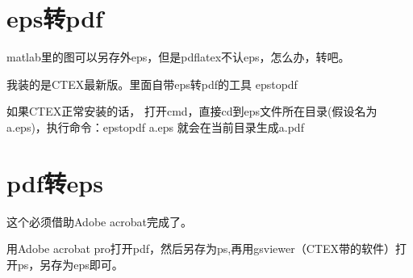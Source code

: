 \documentclass[10pt,a4paper]{article}
\begin{document}
\begin{CJK*}{UTF8}{song}
\section{eps转pdf}
matlab里的图可以另存外eps，但是pdflatex不认eps，怎么办，转吧。

我装的是CTEX最新版。里面自带eps转pdf的工具 epstopdf

如果CTEX正常安装的话， 打开cmd，直接cd到eps文件所在目录(假设名为a.eps)，执行命令：epstopdf a.eps  就会在当前目录生成a.pdf

\section{pdf转eps}
这个必须借助Adobe acrobat完成了。

用Adobe acrobat pro打开pdf，然后另存为ps,再用gsviewer（CTEX带的软件）打开ps，另存为eps即可。

\end{CJK*}
\end{document}
